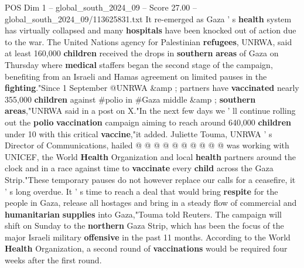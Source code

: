 \begin{textsample}{POS Dim 1 – global\_south\_2024\_09 – Score 27.00 – global\_south\_2024\_09/113625831.txt}
It re-emerged as Gaza ' s \textbf{health} system has virtually collapsed and many \textbf{hospitals} have been knocked out of action due to the war.
The United Nations agency for Palestinian \textbf{refugees}, UNRWA, said at least 160,000 \textbf{children} received the drops in \textbf{southern} \textbf{areas} of Gaza on Thursday where \textbf{medical} staffers began the second stage of the campaign, benefiting from an Israeli and Hamas agreement on limited pauses in the \textbf{fighting}."Since 1 September @UNRWA \&amp ; partners have \textbf{vaccinated} nearly 355,000 \textbf{children} against \#polio in \#Gaza middle \&amp ; \textbf{southern} \textbf{areas},"UNRWA said in a post on X."In the next few days we ' ll continue rolling out the \textbf{polio} \textbf{vaccination} campaign aiming to reach around 640,000 \textbf{children} under 10 with this critical \textbf{vaccine},"it added.
Juliette Touma, UNRWA ' s Director of Communications, hailed @ @ @ @ @ @ @ @ @ @ was working with UNICEF, the World \textbf{Health} Organization and local \textbf{health} partners around the clock and in a race against time to \textbf{vaccinate} every \textbf{child} across the Gaza Strip."These temporary pauses do not however replace our calls for a ceasefire, it ' s long overdue.
It ' s time to reach a deal that would bring \textbf{respite} for the people in Gaza, release all hostages and bring in a steady flow of commercial and \textbf{humanitarian} \textbf{supplies} into Gaza,"Touma told Reuters.
The campaign will shift on Sunday to the \textbf{northern} Gaza Strip, which has been the focus of the major Israeli military \textbf{offensive} in the past 11 months.
According to the World \textbf{Health} Organization, a second round of \textbf{vaccinations} would be required four weeks after the first round.

\end{textsample}
